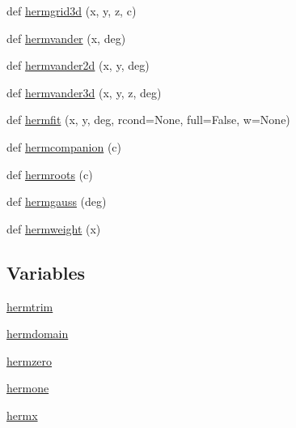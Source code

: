 \begin{DoxyCompactItemize}
\item 
def \hyperlink{namespacenumpy_1_1polynomial_1_1hermite_abcce001be1631c8db73877468837b937}{hermgrid3d} (x, y, z, c)
\item 
def \hyperlink{namespacenumpy_1_1polynomial_1_1hermite_a14796e0a003d1d2ca15b7bb86fc72d9d}{hermvander} (x, deg)
\item 
def \hyperlink{namespacenumpy_1_1polynomial_1_1hermite_acbdc892710386fc723e25c5b3459919d}{hermvander2d} (x, y, deg)
\item 
def \hyperlink{namespacenumpy_1_1polynomial_1_1hermite_aaa1c41cb6e83dda4459be6b5a51f4eda}{hermvander3d} (x, y, z, deg)
\item 
def \hyperlink{namespacenumpy_1_1polynomial_1_1hermite_a5b2e1d57bc46ea03778b8ce3eabc5382}{hermfit} (x, y, deg, rcond=None, full=False, w=None)
\item 
def \hyperlink{namespacenumpy_1_1polynomial_1_1hermite_a1fd820cfc82c6018045ac52f25a8ef3e}{hermcompanion} (c)
\item 
def \hyperlink{namespacenumpy_1_1polynomial_1_1hermite_a1e3a29f02bfce00a0eff1c5538e55af0}{hermroots} (c)
\item 
def \hyperlink{namespacenumpy_1_1polynomial_1_1hermite_afc39b291807683689cfc5fed696a5f88}{hermgauss} (deg)
\item 
def \hyperlink{namespacenumpy_1_1polynomial_1_1hermite_aceb17ee21a23a90b1948210b7fdb8f66}{hermweight} (x)
\end{DoxyCompactItemize}
\subsection*{Variables}
\begin{DoxyCompactItemize}
\item 
\hyperlink{namespacenumpy_1_1polynomial_1_1hermite_ac09c04a738edc6e0de3951a4a145858e}{hermtrim}
\item 
\hyperlink{namespacenumpy_1_1polynomial_1_1hermite_aa0b8fd679b5ed672328fa24df25edbe4}{hermdomain}
\item 
\hyperlink{namespacenumpy_1_1polynomial_1_1hermite_a5d7fe745a23aff201b17f04f814c3f91}{hermzero}
\item 
\hyperlink{namespacenumpy_1_1polynomial_1_1hermite_a441ffd8d7877ebdc21615a66459904cf}{hermone}
\item 
\hyperlink{namespacenumpy_1_1polynomial_1_1hermite_ae6f85629ccf1396f08bba6a5d1a33799}{hermx}
\end{DoxyCompactItemize}


